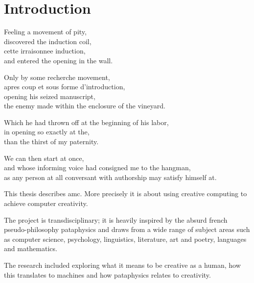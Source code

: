 
\chapter{Introduction}
\label{ch:introduction}

\startcontents[chapters]

\vfill

Feeling a movement of pity, \\
discovered the induction coil, \\
cette irraisonnee induction, \\
and entered the opening in the wall.

Only by some recherche movement, \\
apres coup et sous forme d'introduction, \\
opening his seized manuscript, \\
the enemy made within the enclosure of the vineyard.

Which he had thrown off at the beginning of his labor, \\
in opening so exactly at the, \\
than the thirst of my paternity.

We can then start at once, \\
and whose informing voice had consigned me to the hangman, \\
as any person at all conversant with authorship may satisfy himself at.

\newpage
\minicontents
\spirals

This thesis describes \gls{amc}. More precisely it is about using creative computing to achieve computer creativity.

The project is transdisciplinary; it is heavily inspired by the absurd french pseudo-philosophy pataphysics and draws from a wide range of subject areas such as computer science, psychology, linguistics, literature, art and poetry, languages and mathematics.

The research included exploring what it means to be creative as a human, how this translates to machines and how pataphysics relates to creativity.

\begin{draft}
  
\end{draft}

